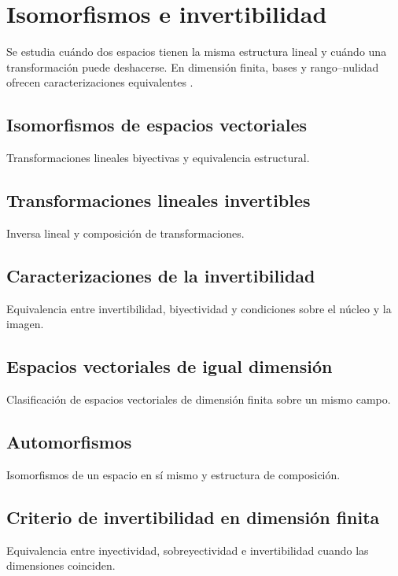 \chapter{Isomorfismos e invertibilidad}
\label{cap:isomorfismos}

Se estudia cuándo dos espacios tienen la misma estructura lineal y cuándo una transformación puede deshacerse. En dimensión finita, bases y rango--nulidad ofrecen caracterizaciones equivalentes \cite{lang1987,hoffmankunze1971}.

\section{Isomorfismos de espacios vectoriales}
Transformaciones lineales biyectivas y equivalencia estructural.

\section{Transformaciones lineales invertibles}
Inversa lineal y composición de transformaciones.

\section{Caracterizaciones de la invertibilidad}
Equivalencia entre invertibilidad, biyectividad y condiciones sobre el núcleo y la imagen.

\section{Espacios vectoriales de igual dimensión}
Clasificación de espacios vectoriales de dimensión finita sobre un mismo campo.

\section{Automorfismos}
Isomorfismos de un espacio en sí mismo y estructura de composición.

\section{Criterio de invertibilidad en dimensión finita}
Equivalencia entre inyectividad, sobreyectividad e invertibilidad cuando las dimensiones coinciden.
